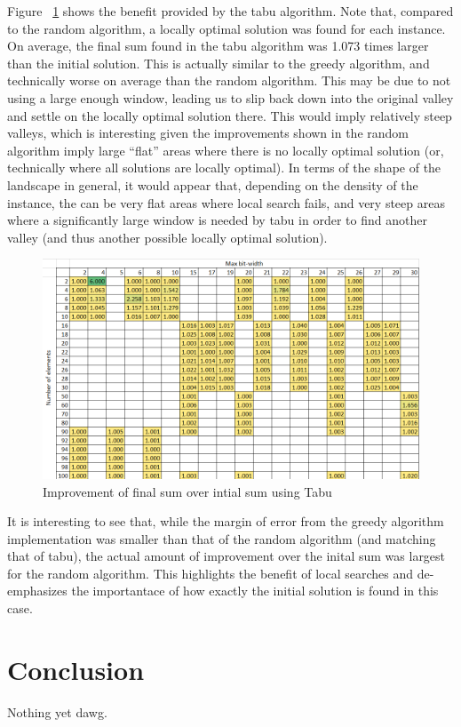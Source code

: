 \documentclass{report}
\begin{document}
Figure ~\ref{fig:tabu_final_initial_compare} shows the benefit provided by the tabu algorithm.
Note that, compared to the random algorithm, a locally optimal solution was found for each instance. On average,
the final sum found in the tabu algorithm was 1.073 times larger than the initial solution. This is actually similar
to the greedy algorithm, and technically worse on average than the random algorithm. This may be due to not using
a large enough window, leading us to slip back down into the original valley and settle on the locally optimal solution there.
This would imply relatively steep valleys, which is interesting given the improvements shown in the random algorithm
imply large ``flat'' areas where there is no locally optimal solution (or, technically where all solutions are locally optimal).
In terms of the shape of the landscape in general, it would appear that, depending on the density of the instance,
the can be very flat areas where local search fails, and very steep areas where a significantly large window is needed
by tabu in order to find another valley (and thus another possible locally optimal solution).

\begin{figure}[h]
  \centering
  \includegraphics[width=12cm]{p5_tabu_final_over_initial.png}
  \caption{Improvement of final sum over intial sum using Tabu}
  \label{fig:tabu_final_initial_compare}
\end{figure}


It is interesting to see that, while the margin of error from the greedy algorithm implementation was smaller than
that of the random algorithm (and matching that of tabu), the actual amount of improvement over the inital sum was largest
for the random algorithm. This highlights the benefit of local searches and de-emphasizes the importantace of how exactly
the initial solution is found in this case. 

\chapter{Conclusion}
Nothing yet dawg.



\end{document}
